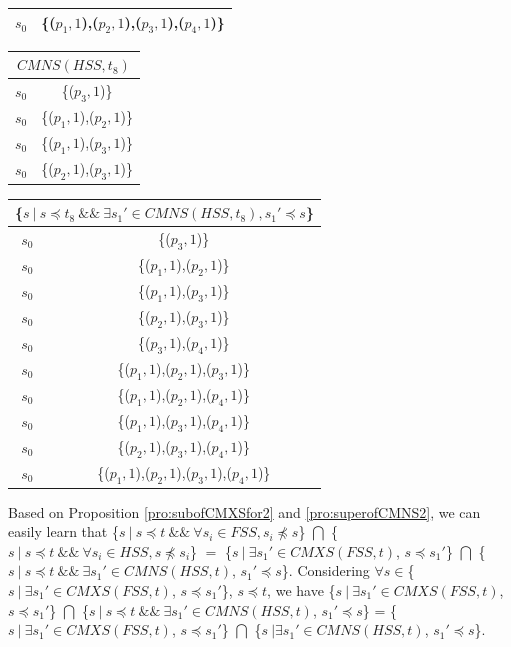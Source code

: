 {\begin{table}[htbp]
\begin{tabular}{|c|c|}
   $s_{0}$ & \{($p_{1}, 1$),($p_{2}, 1$),($p_{3}, 1$),($p_{4}, 1$)\} \\  \hline
    \end{tabular}%
\quad
    \begin{tabular}{|c|c|} \hline
     \multicolumn{2}{|c|}{$CMNS(HSS, t_{8})$} \\ \hline
   $s_{0}$ & \{($p_{3}, 1$)\}\\
   $s_{0}$ & \{($p_{1}, 1$),($p_{2}, 1$)\} \\
   $s_{0}$ & \{($p_{1}, 1$),($p_{3}, 1$)\} \\
   $s_{0}$ & \{($p_{2}, 1$),($p_{3}, 1$)\} \\
    \hline
    \end{tabular}%
\quad
    \begin{tabular}{|c|c|} \hline
   \multicolumn{2}{|c|}{\{$ s\ |\ s \preceq t_{8}\ \&\& \ \exists s_{1}' \in CMNS(HSS, t_{8}), s_{1}' \preceq s$\}}\\ \hline
   $s_{0}$ & \{($p_{3}, 1$)\} \\

   $s_{0}$ & \{($p_{1}, 1$),($p_{2}, 1$)\} \\
   $s_{0}$ & \{($p_{1}, 1$),($p_{3}, 1$)\} \\
   $s_{0}$ & \{($p_{2}, 1$),($p_{3}, 1$)\} \\
   $s_{0}$ & \{($p_{3}, 1$),($p_{4}, 1$)\} \\

   $s_{0}$ & \{($p_{1}, 1$),($p_{2}, 1$),($p_{3}, 1$)\} \\
   $s_{0}$ & \{($p_{1}, 1$),($p_{2}, 1$),($p_{4}, 1$)\} \\
   $s_{0}$ & \{($p_{1}, 1$),($p_{3}, 1$),($p_{4}, 1$)\} \\
   $s_{0}$ & \{($p_{2}, 1$),($p_{3}, 1$),($p_{4}, 1$)\} \\


   $s_{0}$ & \{($p_{1}, 1$),($p_{2}, 1$),($p_{3}, 1$),($p_{4}, 1$)\} \\  \hline
    \end{tabular}%
\end{table}


Based on Proposition \ref{pro:subofCMXSfor2} and \ref{pro:superofCMNS2}, we can easily learn that \{$s\ |\ s \preceq t\ \&\&\ \forall s_{i} \in FSS, s_{i} \npreceq s $\} $\bigcap$ \{$s\ |\ s \preceq t\ \&\&\ \forall s_{i} \in HSS, s \npreceq s_{i} $\}  $=$  \{$ s\ |\ \exists s_{1}' \in CMXS(FSS, t)$, $s \preceq s_{1}'$\} $\bigcap$  \{$ s\ |\ s \preceq t \ \&\& \ \exists s_{1}' \in CMNS(HSS, t)$, $s_{1}' \preceq s$\}.  Considering $\forall s \in $\{$ s\ |\ \exists s_{1}' \in CMXS(FSS, t)$, $s \preceq s_{1}'$\}, $s \preceq t$, we have  \{$ s\ |\ \exists s_{1}' \in CMXS(FSS, t)$, $s \preceq s_{1}'$\} $\bigcap$  \{$ s\ |\ s \preceq t \ \&\& \ \exists s_{1}' \in CMNS(HSS, t)$, $s_{1}' \preceq s$\} =  \{$ s\ |\ \exists s_{1}' \in CMXS(FSS, t)$, $s \preceq s_{1}'$\} $\bigcap$  \{$ s\ | \exists s_{1}' \in CMNS(HSS, t)$, $s_{1}' \preceq s$\}.

}
